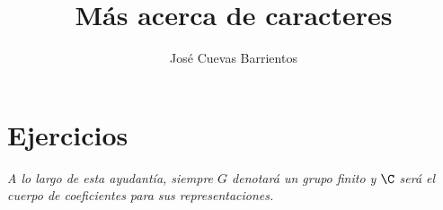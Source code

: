 \documentclass[11pt, reqno]{amsart}
\title{Más acerca de caracteres}
\date{\DTMdate{2025-10-15}}
\author{José Cuevas Barrientos}
\begin{document}
\maketitle

\section{Ejercicios}
\begin{center}
	\slshape
	A lo largo de esta ayudantía, siempre $G$ denotará un grupo finito y $\C$ será el cuerpo de coeficientes para sus representaciones.
\end{center}




\end{document}
